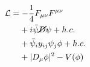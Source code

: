 \begin{align}
  \mathcal{L} &= - \frac{1}{4} F_{\mu \nu} F^{\mu \nu} \\
  &\phantom{{}=}+ i \bar{\psi} \cancel{D} \psi + h.c. \\
  &\phantom{{}=}+ \bar{\psi}_i y_{ij} \psi_j \phi + h.c. \\
  &\phantom{{}=}+ |D_\mu \phi|^2 - V(\phi)
  \label{eq:smlang}
\end{align}
